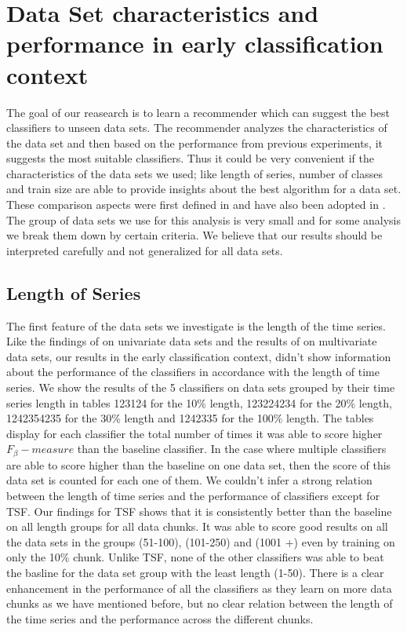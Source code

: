 \section{Data Set characteristics and performance in early classification context}
\label{SectionDataCharacteristicsandPerformance}
The goal of our reasearch is to learn a recommender which can suggest the best classifiers to unseen data sets.
The recommender analyzes the characteristics of the data set and then based on the performance from previous experiments, it suggests the most suitable classifiers.
Thus it could be very convenient if the characteristics of the data sets we used; like length of series, number of classes and train size are able to provide insights about the best algorithm for a data set.
These comparison aspects were first defined in \cite{bagnall2017great} and have also been adopted in \cite{fawaz2019deepreview}.
The group of data sets we use for this analysis is very small and for some analysis we break them down by certain criteria.
We believe that our results should be interpreted carefully and not generalized for all data sets.

\subsection{Length of Series}
The first feature of the data sets we investigate is the length of the time series.
Like the findings of \cite{bagnall2017great} on univariate data sets and the results of \cite{fawaz2019deepreview} on multivariate data sets,
our results in the early classification context, didn't show information about the performance of the classifiers in accordance with the length of time series.
We show the results of the 5 classifiers on data sets grouped by their time series length in tables 123124 for the 10\% length, 123224234 for the 20\% length, 1242354235 for the 30\% length and 1242335 for the 100\% length.
The tables display for each classifier the total number of times it was able to score higher $F_{\beta}-measure$ than the baseline classifier.
In the case where multiple classifiers are able to score higher than the baseline on one data set, then the score of this data set is counted for each one of them.
We couldn't infer a strong relation between the length of time series and the performance of classifiers except for TSF. 
Our findings for TSF shows that it is consistently better than the baseline on all length groups for all data chunks.
It was able to score good results on all the data sets in the groups (51-100), (101-250) and (1001 +) even by training on only the 10\% chunk.
Unlike TSF, none of the other classifiers was able to beat the basline for the data set group with the least length (1-50).
There is a clear enhancement in the performance of all the classifiers as they learn on more data chunks as we have mentioned before,
but no clear relation between the length of the time series and the performance across the different chunks.

